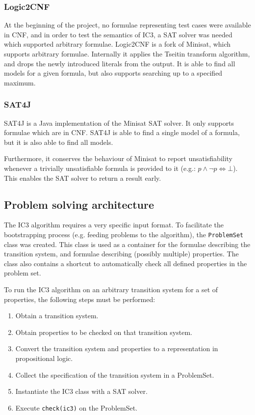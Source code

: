 \documentclass[a4paper]{article}
\begin{document}
\subsubsection{Logic2CNF}
At the beginning of the project, no formulae representing test cases were available in CNF, and in order to test the semantics of IC3, a SAT solver was needed which supported arbitrary formulae. Logic2CNF is a fork of Minisat, which supports arbitrary formulae. Internally it applies the Tseitin transform algorithm, and drops the newly introduced literals from the output. It is able to find all models for a given formula, but also supports searching up to a specified maximum.

\subsubsection{SAT4J}
SAT4J is a Java implementation of the Minisat SAT solver. It only supports formulae which are in CNF. SAT4J is able to find a single model of a formula, but it is also able to find all models.

Furthermore, it conserves the behaviour of Minisat to report unsatisfiability whenever a trivially unsatisfiable formula is provided to it (e.g.: $p \land \lnot p \Leftrightarrow \bot$). This enables the SAT solver to return a result early.

\subsection{Problem solving architecture}
The IC3 algorithm requires a very specific input format. To facilitate the bootstrapping process (e.g. feeding problems to the algorithm), the \texttt{ProblemSet} class was created. This class is used as a container for the formulae describing the transition system, and formulae describing (possibly multiple) properties. The class also contains a shortcut to automatically check all defined properties in the problem set.

To run the IC3 algorithm on an arbitrary transition system for a set of properties, the following steps must be performed:
\begin{enumerate}
\item Obtain a transition system.
\item Obtain properties to be checked on that transition system.
\item Convert the transition system and properties to a representation in propositional logic.
\item Collect the specification of the transition system in a ProblemSet.
\item Instantiate the IC3 class with a SAT solver.
\item Execute \texttt{check(ic3)} on the ProblemSet.
\end{enumerate}
\end{document}
